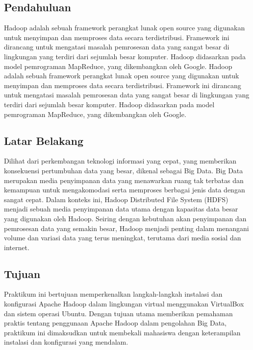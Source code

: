 \begin{multicols}{2}
\tableofcontents
\section{Pendahuluan}
Hadoop adalah sebuah framework perangkat lunak open source yang digunakan untuk menyimpan dan memproses data secara terdistribusi. Framework ini dirancang untuk mengatasi masalah pemrosesan data yang sangat besar di lingkungan yang terdiri dari sejumlah besar komputer. Hadoop didasarkan pada model pemrograman MapReduce, yang dikembangkan oleh Google. Hadoop adalah sebuah framework perangkat lunak open source yang digunakan untuk menyimpan dan memproses data secara terdistribusi. Framework ini dirancang untuk mengatasi masalah pemrosesan data yang sangat besar di lingkungan yang terdiri dari sejumlah besar komputer. Hadoop didasarkan pada model pemrograman MapReduce, yang dikembangkan oleh Google.
\subsection{Latar Belakang}
Dilihat dari perkembangan teknologi informasi yang cepat, yang memberikan konsekuensi pertumbuhan data yang besar, dikenal sebagai Big Data. Big Data merupakan media penyimpanan data yang menawarkan ruang tak terbatas dan kemampuan untuk mengakomodasi serta memproses berbagai jenis data dengan sangat cepat. Dalam konteks ini, Hadoop Distributed File System (HDFS) menjadi sebuah media penyimpanan data utama dengan kapasitas data besar yang digunakan oleh Hadoop. Seiring dengan kebutuhan akan penyimpanan dan pemrosesan data yang semakin besar, Hadoop menjadi penting dalam menangani volume dan variasi data yang terus meningkat, terutama dari media sosial dan internet.
\subsection{Tujuan}
Praktikum ini bertujuan memperkenalkan langkah-langkah instalasi dan konfigurasi Apache Hadoop dalam lingkungan virtual menggunakan VirtualBox dan sistem operasi Ubuntu. Dengan tujuan utama memberikan pemahaman praktis tentang penggunaan Apache Hadoop dalam pengolahan Big Data, praktikum ini dimaksudkan untuk membekali mahasiswa dengan keterampilan instalasi dan konfigurasi yang mendalam.

\end{multicols}
